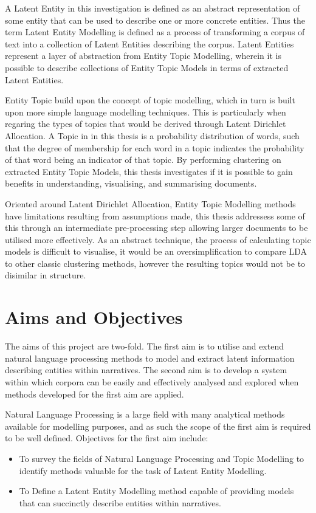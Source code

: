 \documentclass[10pt]{report}
\begin{document}
A Latent Entity in this investigation is defined as an abstract representation of some entity that can be used to describe one or more concrete entities. Thus the term Latent Entity Modelling is defined as a process of transforming a corpus of text into a collection of Latent Entities describing the corpus. Latent Entities represent a layer of abstraction from Entity Topic Modelling, wherein it is possible to describe collections of Entity Topic Models in terms of extracted Latent Entities.

Entity Topic build upon the concept of topic modelling, which in turn is built upon more simple language modelling techniques. This is particularly when regaring the types of topics that would be derived through Latent Dirichlet Allocation. A Topic in in this thesis is a probability distribution of words, such that the degree of membership for each word in a topic indicates the probability of that word being an indicator of that topic. By performing clustering on extracted Entity Topic Models, this thesis investigates if it is possible to gain benefits in understanding, visualising, and summarising documents. 

Oriented around Latent Dirichlet Allocation, Entity Topic Modelling methods have limitations resulting from assumptions made, this thesis addressess some of this through an intermediate pre-processing step allowing larger documents to be utilised more effectively. As an abstract technique, the process of calculating topic models is difficult to visualise, it would be an oversimplification to compare LDA to other classic clustering methods, however the resulting topics would not be to disimilar in structure.

\section{Aims and Objectives}
The aims of this project are two-fold. The first aim is to utilise and extend natural language processing methods to model and extract latent information describing entities within narratives. The second aim is to develop a system within which corpora can be easily and effectively analysed and explored when methods developed for the first aim are applied.

Natural Language Processing is a large field with many analytical methods available for modelling purposes, and as such the scope of the first aim is required to be well defined. Objectives for the first aim include:

\renewcommand{\baselinestretch}{1.0}\normalsize
\begin{itemize}
\item To survey the fields of Natural Language Processing and Topic Modelling to identify methods valuable for the task of Latent Entity Modelling.
\item To Define a Latent Entity Modelling method capable of providing models that can succinctly describe entities within narratives.
\end{itemize}
\end{document}
